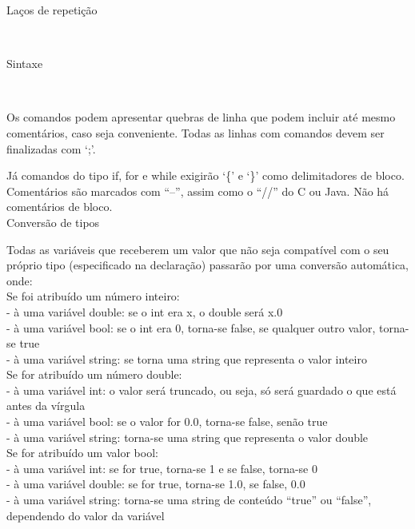 \documentclass[12pt,a4paper]{article}
\begin{document}

\hypertarget{label5}{\Large{Laços de repetição}}\\[0.3cm]
\normalsize


\hypertarget{label6}{\Large{Sintaxe}}\\[0.3cm]
\normalsize

Os comandos podem apresentar quebras de linha que podem incluir até mesmo comentários, caso seja conveniente. Todas as linhas com comandos devem ser finalizadas com `;'.

Já comandos do tipo if, for e while exigirão `\{' e `\}' como delimitadores de bloco.
Comentários são marcados com ``--'', assim como o ``//'' do C ou Java. Não há comentários de bloco.\\

\hypertarget{label8}{\Large{Conversão de tipos}}\\[0.3cm]
\normalsize

Todas as variáveis que receberem um valor que não seja compatível com o seu próprio tipo (especificado na declaração) passarão por uma conversão automática, onde: \\

Se foi atribuído um número inteiro:\\
- à uma variável double: se o int era x, o double será x.0\\
- à uma variável bool: se o int era 0, torna-se false, se qualquer outro valor, torna-se true\\
- à uma variável string: se torna uma string que representa o valor inteiro\\[0.3cm]

Se for atribuído um número double:\\
- à uma variável int: o valor será truncado, ou seja, só será guardado o que está antes da vírgula\\
- à uma variável bool: se o valor for 0.0, torna-se false, senão true\\
- à uma variável string: torna-se uma string que representa o valor double\\[0.3cm]

Se for atribuído um valor bool:\\
- à uma variável int: se for true, torna-se 1 e se false, torna-se 0\\
- à uma variável double: se for true, torna-se 1.0, se false, 0.0\\
- à uma variável string: torna-se uma string de conteúdo ``true'' ou ``false'', dependendo do valor da variável\\[0.3cm]
\end{document}
